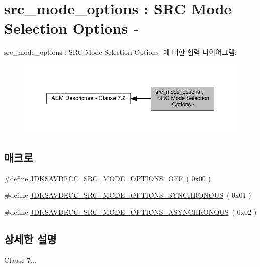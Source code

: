 \hypertarget{group__src__mode__options}{}\section{src\+\_\+mode\+\_\+options \+: S\+RC Mode Selection Options -\/}
\label{group__src__mode__options}
src\+\_\+mode\+\_\+options \+: S\+RC Mode Selection Options -\/에 대한 협력 다이어그램\+:
\nopagebreak
\begin{figure}[H]
\begin{center}
\leavevmode
\includegraphics[width=350pt]{group__src__mode__options}
\end{center}
\end{figure}
\subsection*{매크로}
\begin{DoxyCompactItemize}
\item 
\#define \hyperlink{group__src__mode__options_ga82241cc282065aed3af27cc1bbf20268}{J\+D\+K\+S\+A\+V\+D\+E\+C\+C\+\_\+\+S\+R\+C\+\_\+\+M\+O\+D\+E\+\_\+\+O\+P\+T\+I\+O\+N\+S\+\_\+\+O\+FF}~( 0x00 )
\item 
\#define \hyperlink{group__src__mode__options_ga2548e0b62f60b7929c16ab2252178b73}{J\+D\+K\+S\+A\+V\+D\+E\+C\+C\+\_\+\+S\+R\+C\+\_\+\+M\+O\+D\+E\+\_\+\+O\+P\+T\+I\+O\+N\+S\+\_\+\+S\+Y\+N\+C\+H\+R\+O\+N\+O\+US}~( 0x01 )
\item 
\#define \hyperlink{group__src__mode__options_gad67e4583e3887803dab683fbc7f54d83}{J\+D\+K\+S\+A\+V\+D\+E\+C\+C\+\_\+\+S\+R\+C\+\_\+\+M\+O\+D\+E\+\_\+\+O\+P\+T\+I\+O\+N\+S\+\_\+\+A\+S\+Y\+N\+C\+H\+R\+O\+N\+O\+US}~( 0x02 )
\end{DoxyCompactItemize}


\subsection{상세한 설명}
Clause 7... 

